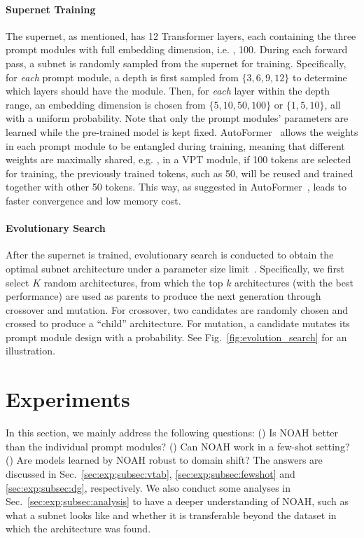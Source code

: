 \paragraph{Supernet Training} The supernet, as mentioned, has 12 Transformer layers, each containing the three prompt modules with full embedding dimension, i.e. , 100. During each forward pass, a subnet is randomly sampled from the supernet for training. Specifically, for \emph{each} prompt module, a depth is first sampled from $\{3, 6, 9, 12\}$ to determine which layers should have the module. Then, for \emph{each} layer within the depth range, an embedding dimension is chosen from $\{5, 10, 50, 100\}$ or $\{1, 5, 10\}$, all with a uniform probability. Note that only the prompt modules' parameters are learned while the pre-trained model is kept fixed. AutoFormer~\cite{chen2021autoformer} allows the weights in each prompt module to be entangled during training, meaning that different weights are maximally shared, e.g. , in a VPT module, if 100 tokens are selected for training, the previously trained tokens, such as 50, will be reused and trained together with other 50 tokens. This way, as suggested in AutoFormer~\cite{chen2021autoformer}, leads to faster convergence and low memory cost.

\paragraph{Evolutionary Search} After the supernet is trained, evolutionary search is conducted to obtain the optimal subnet architecture under a parameter size limit~\cite{chen2021autoformer}. Specifically, we first select $K$ random architectures, from which the top $k$ architectures (with the best performance) are used as parents to produce the next generation through crossover and mutation. For crossover, two candidates are randomly chosen and crossed to produce a ``child'' architecture. For mutation, a candidate mutates its prompt module design with a probability. See Fig.~\ref{fig:evolution_search} for an illustration.

\section{Experiments}
\label{sec:exp}

In this section, we mainly address the following questions: () Is NOAH better than the individual prompt modules? () Can NOAH work in a few-shot setting? () Are models learned by NOAH robust to domain shift? The answers are discussed in Sec.~\ref{sec:exp;subsec:vtab}, \ref{sec:exp;subsec:fewshot} and \ref{sec:exp;subsec:dg}, respectively. We also conduct some analyses in Sec.~\ref{sec:exp;subsec:analysis} to have a deeper understanding of NOAH, such as what a subnet looks like and whether it is transferable beyond the dataset in which the architecture was found.

